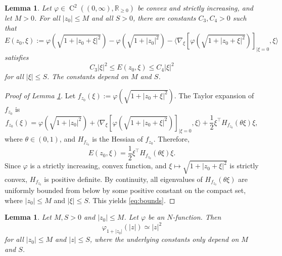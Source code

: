 \documentclass[a4paper,11pt]{amsart}
\numberwithin{equation}{section}
\newcommand{\hold}{\operatorname{C}}
\newtheorem{lemma}[defi]{Lemma}
\begin{document}
	\begin{lemma} \label{lem:aux2}
		Let $\varphi \in \hold^2((0, \infty), \mathbb{R}_{\geq 0})$ {be convex and strictly increasing}, and let $M>0$. For all $|z_0| \leq M$ and all $S>0$, there are constants $C_3, C_4 > 0$ such that 
		\[
		E(z_0, \xi) := \varphi(\sqrt{1+|z_0+\xi|^2}) - \varphi(\sqrt{1+|z_0|^2}) - \langle \nabla_\xi[\varphi(\sqrt{1+|z_0+\xi|^2})]_{\mid \xi=0}, \xi \rangle
		\]
		satisfies
		\begin{equation}
			C_3 |\xi|^2 \leq E(z_0, \xi) \leq C_4 |\xi|^2 \label{eq:bounds}
		\end{equation}
		for all $|\xi|\leq S$. The constants depend on $M$ and $S$.
	\end{lemma}
	\begin{proof}[{Proof of Lemma \ref{lem:aux2}}]
		{
			Let $f_{z_0}(\xi) := \varphi \left(\sqrt{1+|z_0 + \xi|^2} \right)$. The Taylor expansion of $f_{z_0}$ is \[
			f_{z_0} (\xi) =  \varphi(\sqrt{1+|z_0|^2}) + \langle \nabla_\xi[\varphi(\sqrt{1+|z_0+\xi|^2})]_{\mid \xi=0}, \xi \rangle + \frac{1}{2} \xi^\top H_{f_{z_0}} (\theta \xi) \xi,
			\]
			where $\theta \in (0,1)$, and $H_{f_{z_0}}$ is the Hessian of $f_{z_0}$. Therefore, \[
			E(z_0, \xi) = \frac{1}{2} \xi^\top H_{f_{z_0}}(\theta \xi) \xi. 
			\]
			Since $\varphi$ is a strictly increasing, convex function, and $\xi \mapsto \sqrt{1+|z_0 + \xi|^2}$ is strictly convex, $H_{f_{z_0}}$ is positive definite. By continuity, all eigenvalues of $H_{f_{z_0}} (\theta \xi)$ are uniformly bounded from below by some positive constant on the compact set, where $|z_0| \leq M$ and $|\xi| \leq S$. This yields \eqref{eq:bounds}.}
	\end{proof}
	
	
	
	\begin{lemma} \label{lem:quadr}
		Let $M,S>0$ and $|z_0| \leq M$. Let $\varphi$ be an $N$-function. Then \[
		\varphi_{1+|z_0|}(|z|) \simeq |z|^2 
		\]
		for all $|z_0| \leq M$ and $|z| \leq S$, where the underlying constants only depend on $M$ and $S$.
	\end{lemma}
	
\end{document}
